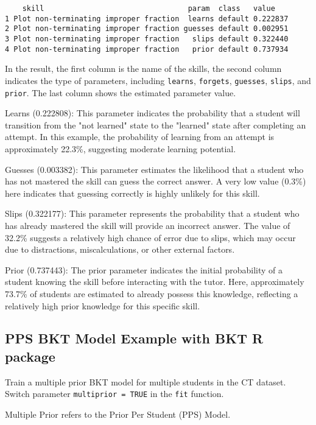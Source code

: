 \documentclass{article}
\begin{document}
\begin{verbatim}
    skill                                 param  class   value
1 Plot non-terminating improper fraction  learns default 0.222837
2 Plot non-terminating improper fraction guesses default 0.002951
3 Plot non-terminating improper fraction   slips default 0.322440
4 Plot non-terminating improper fraction   prior default 0.737934
\end{verbatim}

In the result, the first column is the name of the skills, the second column indicates the type of parameters, including \texttt{learns}, \texttt{forgets}, \texttt{guesses}, \texttt{slips}, and \texttt{prior}. The last column shows the estimated parameter value.

Learns (0.222808): This parameter indicates the probability that a student will transition from the "not learned" state to the "learned" state after completing an attempt. In this example, the probability of learning from an attempt is approximately 22.3\%, suggesting moderate learning potential.

Guesses (0.003382): This parameter estimates the likelihood that a student who has not mastered the skill can guess the correct answer. A very low value (0.3\%) here indicates that guessing correctly is highly unlikely for this skill.

Slips (0.322177): This parameter represents the probability that a student who has already mastered the skill will provide an incorrect answer. The value of 32.2\% suggests a relatively high chance of error due to slips, which may occur due to distractions, miscalculations, or other external factors.

Prior (0.737443): The prior parameter indicates the initial probability of a student knowing the skill before interacting with the tutor. Here, approximately 73.7\% of students are estimated to already possess this knowledge, reflecting a relatively high prior knowledge for this specific skill.

\subsection{PPS BKT Model Example with BKT R package}

Train a multiple prior BKT model for multiple students in the CT dataset. Switch parameter \texttt{multiprior = TRUE} in the \texttt{fit} function.

Multiple Prior refers to the Prior Per Student (PPS) Model.
\end{document}

